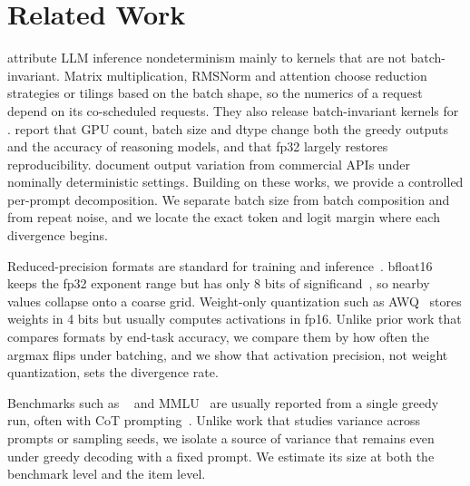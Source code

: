 \section{Related Work}
\label{sec:related}

\citet{he2025nondeterminism} attribute LLM inference nondeterminism mainly to kernels that are not batch-invariant. Matrix multiplication, RMSNorm and attention choose reduction strategies or tilings based on the batch shape, so the numerics of a request depend on its co-scheduled requests. They also release batch-invariant kernels for \vllm. \citet{yuan2025fp32} report that GPU count, batch size and dtype change both the greedy outputs and the accuracy of reasoning models, and that fp32 largely restores reproducibility. \citet{atil2024stability} document output variation from commercial APIs under nominally deterministic settings. Building on these works, we provide a controlled per-prompt decomposition. We separate batch size from batch composition and from repeat noise, and we locate the exact token and logit margin where each divergence begins.

Reduced-precision formats are standard for training and inference~\citep{micikevicius2018mixed}. bfloat16 keeps the fp32 exponent range but has only 8 bits of significand~\citep{kalamkar2019bf16}, so nearby values collapse onto a coarse grid. Weight-only quantization such as AWQ~\citep{lin2024awq} stores weights in 4 bits but usually computes activations in fp16. Unlike prior work that compares formats by end-task accuracy, we compare them by how often the argmax flips under batching, and we show that activation precision, not weight quantization, sets the divergence rate.

Benchmarks such as \gsm~\citep{cobbe2021gsm8k} and MMLU~\citep{hendrycks2021mmlu} are usually reported from a single greedy run, often with CoT prompting~\citep{wei2022cot}. Unlike work that studies variance across prompts or sampling seeds, we isolate a source of variance that remains even under greedy decoding with a fixed prompt. We estimate its size at both the benchmark level and the item level.
